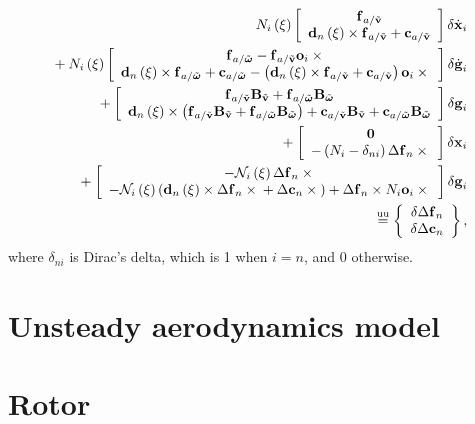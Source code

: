 \begin{align}
	N_i\plbr{\xi} \sqbr{\matr{c}{
		\T{f}_{a/\tilde{\T{v}}} \\
		\T{d}_n\plbr{\xi} \times \T{f}_{a/\tilde{\T{v}}}
		+ \T{c}_{a/\tilde{\T{v}}}
	}} \delta\dot{\T{x}}_i
	\nonumber \\
%
	\mbox{}
	+ N_i\plbr{\xi} \sqbr{\matr{c}{
		\T{f}_{a/\tilde{\T{\omega}}}
		- \T{f}_{a/\tilde{\T{v}}} \T{o}_i \times{} \\
		\T{d}_n\plbr{\xi} \times \T{f}_{a/\tilde{\T{\omega}}}
		+ \T{c}_{a/\tilde{\T{\omega}}}
		- \plbr{
			\T{d}_n\plbr{\xi} \times \T{f}_{a/\tilde{\T{v}}}
			+ \T{c}_{a/\tilde{\T{v}}}
		} \T{o}_i \times{}
	}} \delta\dot{\T{g}}_i
	\nonumber \\
%
	\mbox{}
	+ \sqbr{\matr{c}{
		\T{f}_{a/\tilde{\T{v}}} \TT{B}_{\tilde{\T{v}}}
			+ \T{f}_{a/\tilde{\T{\omega}}} \TT{B}_{\tilde{\T{\omega}}} \\
		\T{d}_n\plbr{\xi} \times \plbr{
			\T{f}_{a/\tilde{\T{v}}} \TT{B}_{\tilde{\T{v}}}
				+ \T{f}_{a/\tilde{\T{\omega}}} \TT{B}_{\tilde{\T{\omega}}}
		}
		+ \T{c}_{a/\tilde{\T{v}}} \TT{B}_{\tilde{\T{v}}}
			+ \T{c}_{a/\tilde{\T{\omega}}} \TT{B}_{\tilde{\T{\omega}}}
	}} \delta\T{g}_i
	\nonumber \\
%
	\mbox{}
	+ \sqbr{\matr{c}{
		\TT{0} \\
		- \plbr{
			N_i - \delta_{ni}
		} \Delta\T{f}_n \times{}
	}} \delta\T{x}_i
	\nonumber \\
%
	\mbox{}
	+ \sqbr{\matr{c}{
		- \mathcal{N}_i\plbr{\xi} \Delta\T{f}_n \times{} \\
		- \mathcal{N}_i\plbr{\xi} \plbr{
			\T{d}_n\plbr{\xi} \times \Delta\T{f}_n \times{}
			+ \Delta\T{c}_n \times{}
		}
		+ \Delta\T{f}_n \times N_i \T{o}_i \times{}
	}} \delta\T{g}_i
	\nonumber \\
%
	\equu
	\cubr{\cvvect{
		\delta\Delta\T{f}_n \\
		\delta\Delta\T{c}_n
	}}
	,
\end{align}
where $\delta_{ni}$ is Dirac's delta, which is 1 when $i=n$, and 0 otherwise.

\section{Unsteady aerodynamics model}


\section{Rotor}

